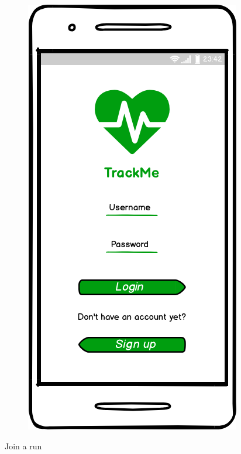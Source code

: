 \documentclass{article}
\begin{document}
\begin{legal}
\begin{legal}
\begin{legal}
\begin{legal}
\begin{figure}[H]
  						\includegraphics[scale=0.3]{./images/mockups/Login-Sign-up.png}
						\end{figure}
					\item Join a run 
						\begin{figure}[H]
						\centering

\end{figure}
\end{legal}
\end{legal}
\end{legal}
\end{legal}
\end{document}
